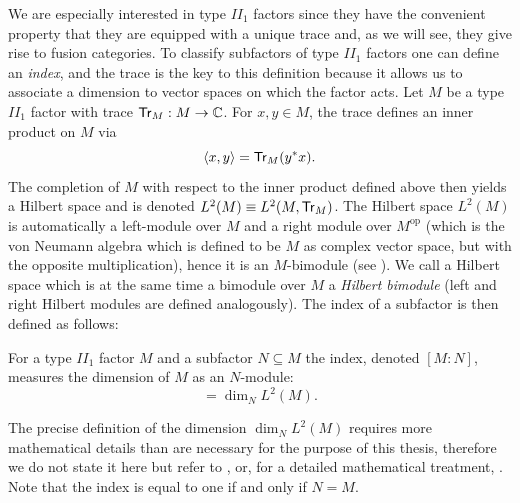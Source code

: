 We are especially interested in type $II_1$ factors since they have the convenient property that they are equipped with a unique trace and, as we will see, they give rise to fusion categories. To classify subfactors of type $II_1$ factors one can define an \emph{index}, and the trace is the key to this definition because it allows us to associate a dimension to vector spaces on which the factor acts. Let $M$ be a type $II_1$ factor with trace $\mathsf{Tr}_M:M\to\mathbb{C}$. For $x,y\in M$, the trace defines an inner product on $M$ via
	\begin{equation}
		\langle x,y\rangle=\mathsf{Tr}_M(y^* x).
	\end{equation}
The completion of $M$ with respect to the inner product defined above then yields a Hilbert space and is denoted $L^2(M)\equiv L^2(M,\mathsf{Tr}_M)$. The Hilbert space $L^2(M)$ is automatically a left-module over $M$ and a right module over $M^\mathrm{op}$ (which is the von Neumann algebra which is defined to be $M$ as complex vector space, but with the opposite multiplication), hence it is an $M$-bimodule (see \cite{Thom2006}). We call a Hilbert space which is at the same time a bimodule over $M$ a \emph{Hilbert bimodule} (left and right Hilbert modules are defined analogously). The index of a subfactor is then defined as follows:
	\begin{defn}
		For a type $II_1$ factor $M$ and a subfactor $N\subseteq M$ the index, denoted $[M:N]$, measures the dimension of $M$ as an $N$-module:
			\begin{equation}
				[M:N]=\dim_N L^2(M).
			\end{equation}
	\end{defn}
The precise definition of the dimension $\dim_N L^2(M)$ requires more mathematical details than are necessary for the purpose of this thesis, therefore we do not state it here but refer to \cite{Jones1997}, or, for a detailed mathematical treatment, \cite{Lueck2002}. Note that the index is equal to one if and only if $N=M$. 

